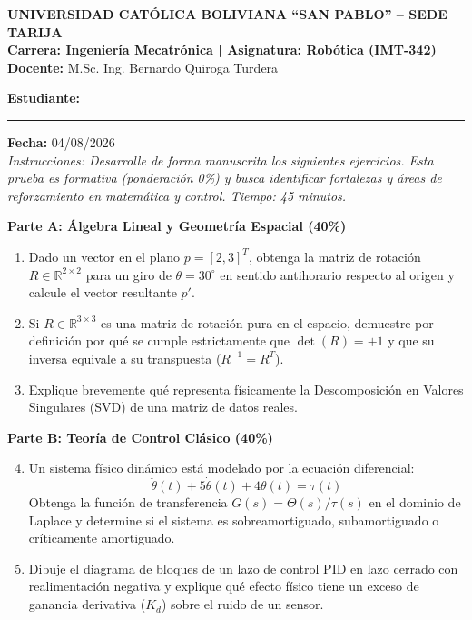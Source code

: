 \documentclass[11pt,a4paper]{article}
\begin{document}
\begin{center}
    \textbf{\Large UNIVERSIDAD CATÓLICA BOLIVIANA ``SAN PABLO'' -- SEDE TARIJA}\\
    \vspace{0.2cm}
    \textbf{Carrera: Ingeniería Mecatrónica | Asignatura: Robótica (IMT-342)} \\ %
    \textbf{Docente:} M.Sc. Ing. Bernardo Quiroga Turdera
\end{center}

\vspace{0.3cm}
\noindent
\textbf{Estudiante:} \rule{8cm}{0.4pt} \hfill \textbf{Fecha:} 04/08/2026 \\

\noindent
\textit{Instrucciones: Desarrolle de forma manuscrita los siguientes ejercicios. Esta prueba es formativa (ponderación 0\%) y busca identificar fortalezas y áreas de reforzamiento en matemática y control. Tiempo: 45 minutos.}

\vspace{0.5cm}
\noindent \textbf{Parte A: Álgebra Lineal y Geometría Espacial (40\%)}

\begin{enumerate}
    \item Dado un vector en el plano $p = [2, 3]^T$, obtenga la matriz de rotación $R \in \mathbb{R}^{2\times2}$ para un giro de $\theta = 30^\circ$ en sentido antihorario respecto al origen y calcule el vector resultante $p'$.
    
    \vspace{2.5cm}
    \item Si $R \in \mathbb{R}^{3\times3}$ es una matriz de rotación pura en el espacio, demuestre por definición por qué se cumple estrictamente que $\det(R) = +1$ y que su inversa equivale a su transpuesta ($R^{-1} = R^T$).
    
    \vspace{2.5cm}
    \item Explique brevemente qué representa físicamente la Descomposición en Valores Singulares (SVD) de una matriz de datos reales.
    \vspace{2cm}
\end{enumerate}

\noindent \textbf{Parte B: Teoría de Control Clásico (40\%)}

\begin{enumerate}
    \setcounter{enumi}{3}
    \item Un sistema físico dinámico está modelado por la ecuación diferencial:
    $$ \ddot{\theta}(t) + 5\dot{\theta}(t) + 4\theta(t) = \tau(t) $$
    Obtenga la función de transferencia $G(s) = \Theta(s)/\tau(s)$ en el dominio de Laplace y determine si el sistema es sobreamortiguado, subamortiguado o críticamente amortiguado.
    
    \vspace{3cm}
    \item Dibuje el diagrama de bloques de un lazo de control PID en lazo cerrado con realimentación negativa y explique qué efecto físico tiene un exceso de ganancia derivativa ($K_d$) sobre el ruido de un sensor.
    \vspace{3cm}
\end{enumerate}
\end{document}
